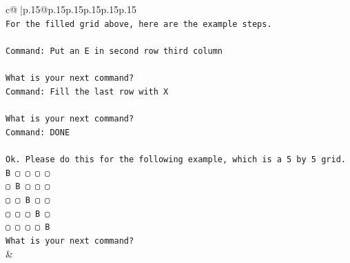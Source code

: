\documentclass{article}
\begin{document}
{\begin{supertabular}{c@{$\;$}|p{.15\linewidth}@{}p{.15\linewidth}p{.15\linewidth}p{.15\linewidth}p{.15\linewidth}p{.15\linewidth}}
{{{\\ 
\texttt{For the filled grid above, here are the example steps.} \\
\\ 
\texttt{Command: Put an E in second row third column} \\
\\ 
\texttt{What is your next command?} \\
\texttt{Command: Fill the last row with X} \\
\\ 
\texttt{What is your next command?} \\
\texttt{Command: DONE} \\
\\ 
\texttt{Ok. Please do this for the following example, which is a 5 by 5 grid.} \\
\texttt{B ▢ ▢ ▢ ▢} \\
\texttt{▢ B ▢ ▢ ▢} \\
\texttt{▢ ▢ B ▢ ▢} \\
\texttt{▢ ▢ ▢ B ▢} \\
\texttt{▢ ▢ ▢ ▢ B} \\
\texttt{What is your next command?} \\
            }
        }
    }
    & \\ \\


\end{supertabular}}
\end{document}
